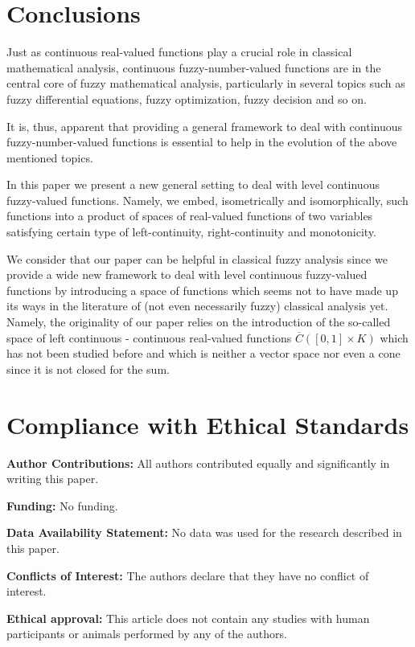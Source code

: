 \documentclass{amsart}
\begin{document}
\section{Conclusions}

Just as continuous real-valued functions play a crucial role in classical mathematical analysis, continuous fuzzy-number-valued functions are in the central core of fuzzy mathematical analysis, particularly in several topics such as fuzzy differential equations, fuzzy optimization, fuzzy decision and so on.

It is, thus, apparent that providing a general framework to deal with  continuous fuzzy-number-valued functions is essential to help in the evolution of the above mentioned topics.

In this paper we present a new general setting to deal with level continuous fuzzy-valued functions. Namely, we embed, isometrically and isomorphically,  such functions into a product of spaces of real-valued functions of two variables satisfying certain type of left-continuity, right-continuity and monotonicity.

We consider that our paper can be helpful in classical fuzzy analysis since we provide a wide new framework
to deal with level continuous fuzzy-valued functions by introducing a space of
functions which seems not to have made up its ways in the literature of (not even
necessarily fuzzy) classical analysis yet.
Namely, the originality of our paper relies on the introduction of the so-called
space of left continuous - continuous real-valued functions $\overline{C}([0,1]\times K)$ which has
not been studied before and which is neither a vector space nor even a cone since
it is not closed for the sum.

\section{Compliance with Ethical Standards}

{\bf Author Contributions:} All authors contributed equally and significantly
in writing this paper.

\bigskip
{\bf Funding:} No funding.


\bigskip
{\bf Data Availability Statement:} No data was used for the research described in this
paper.

\bigskip
{\bf Conflicts of Interest:} The authors declare that they have no conflict of interest.

\bigskip
{\bf Ethical approval:} This article does not contain any studies with human participants or animals performed by any of the authors.
\end{document}

